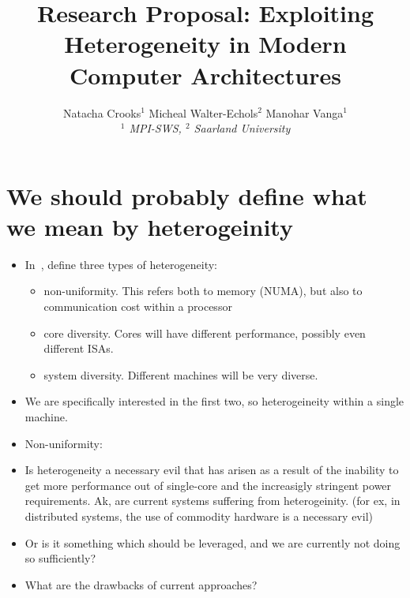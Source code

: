 

\newif \ifDraft\Drafttrue

\ifDraft
  \newcommand{\Comment}[1]{\textbf{\textsl{#1}}}
\else
  \newcommand{\Comment}[1]{\relax}
\fi

\newcommand{\gernot}[1]{\Comment{#1 [gernot]}}


\title{\vspace{-0.8cm}\textbf{
Research Proposal: Exploiting Heterogeneity in Modern Computer Architectures
}}

\author{
Natacha Crooks$^1$ \quad
Micheal Walter-Echols$^2$ \quad
Manohar Vanga$^1$
\\ \emph{$^1$ MPI-SWS, $^2$ Saarland University}
}
\date{\vspace{-12pt}}




\maketitle






\section{We should probably define what
we mean by heterogeinity}

\begin{itemize}
\item In~\cite{SPBRBHI:08}, define three types of heterogeneity:
\begin{itemize}
\item non-uniformity.  This refers both to memory (NUMA), but also
to communication cost within a processor
\item core diversity. Cores will have different performance, possibly
even different ISAs.
\item system diversity. Different machines will be very diverse.
\end{itemize}
\item We are specifically interested in the first two, so heterogeineity
within a single machine.
\item Non-uniformity:
\item Is heterogeneity a necessary evil that has arisen as
a result of the inability to get more performance out of single-core
and the increasigly stringent power requirements. Ak,
are current systems suffering from heterogeinity. (for ex,
in distributed systems, the use of commodity hardware is a necessary evil)
\item Or is it something which should be leveraged, and we are currently
not doing so sufficiently?
\item What are the drawbacks of current approaches?
\end{itemize}
